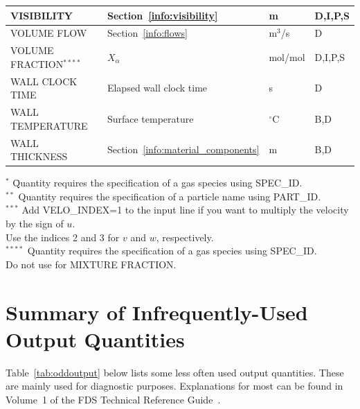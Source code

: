 \documentclass[11pt]{book}
\begin{document}
\begin{longtable}{@{\extracolsep{\fill}}|l|l|l|l|}
{\ct VISIBILITY}                                & Section~\ref{info:visibility}                 & m              & D,I,P,S      \\ \hline
{\ct VOLUME FLOW}                               & Section~\ref{info:flows}                      & m$^3$/s        & D            \\ \hline
{\ct VOLUME FRACTION}$^{****}$                  & $X_\alpha$                                    & mol/mol        & D,I,P,S      \\ \hline
{\ct WALL CLOCK TIME}                           & Elapsed wall clock time                       & s              & D            \\ \hline
{\ct WALL TEMPERATURE}                          & Surface temperature                           & $^\circ$C      & B,D          \\ \hline
{\ct WALL THICKNESS}                            & Section~\ref{info:material_components}        & m              & B,D          \\ \hline
\end{longtable}

\noindent
\begin{tabbing}
$^{*}$  \hspace{0.25in} \= Quantity requires the specification of a gas species using {\ct SPEC\_ID}. \\
$^{**}$                \> Quantity requires the specification of a particle name using {\ct PART\_ID}. \\
$^{***}$               \> Add {\ct VELO\_INDEX=1} to the input line if you want to multiply the velocity by the sign of $u$. \\
                       \> Use the indices 2 and 3 for $v$ and $w$, respectively.\\
$^{****}$              \> Quantity requires the specification of a gas species using {\ct SPEC\_ID}. \\
                       \> Do not use for {\ct MIXTURE FRACTION}.
\end{tabbing}


\clearpage
\section{Summary of Infrequently-Used Output Quantities}
\label{info:oddoutputquantities}

Table~\ref{tab:oddoutput} below lists some less often used output quantities. These are mainly used for diagnostic purposes. Explanations for most can
be found in Volume~1 of the FDS Technical Reference Guide~\cite{FDS_Math_Guide}.
\end{document}
